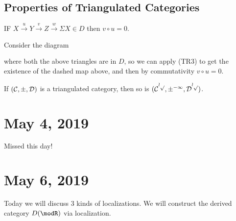 \documentclass[12pt]{article}
\begin{document}
\subsection{Properties of Triangulated Categories}
\begin{prop}
	IF $X\xrightarrow{u}Y\xrightarrow{v} Z\xrightarrow{w}\Sigma X\in D$ then $v\circ u=0$.
\end{prop}
\begin{prf}
	Consider the diagram
	\begin{center}
	\end{center}
	where both the above triangles are in $D$, so we can apply (TR3) to get the existence of the dashed map above, 
	and then by commutativity $v\circ u=0.$
\end{prf}
\begin{prop}
	If $(\cal C,\Sigma, D)$ is a triangulated category, then so is $(\cal{C}^{op},\Sigma^{-1},D^{op})$.
\end{prop}

\section{May 4, 2019}
Missed this day!

\section{May 6, 2019}
Today we will discuss 3 kinds of localizations. We will construct the derived category $D(\modR)$ via localization.
\end{document}

